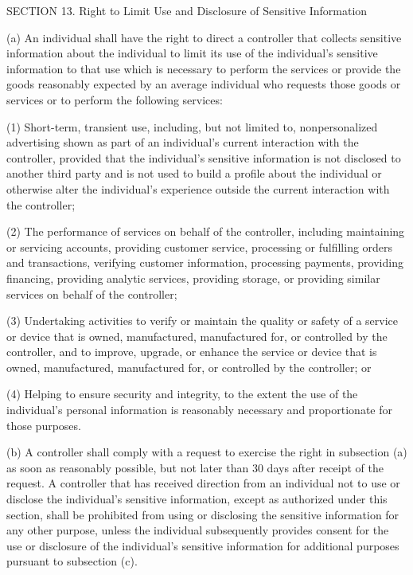 SECTION 13. Right to Limit Use and Disclosure of Sensitive Information

(a) An individual shall have the right to direct a controller that collects sensitive information about the individual to limit its use of the individual’s sensitive information to that use which is necessary to perform the services or provide the goods reasonably expected by an average individual who requests those goods or services or to perform the following services:

(1) Short-term, transient use, including, but not limited to, nonpersonalized advertising shown as part of an individual’s current interaction with the controller, provided that the individual’s sensitive information is not disclosed to another third party and is not used to build a profile about the individual or otherwise alter the individual’s experience outside the current interaction with the controller;

(2) The performance of services on behalf of the controller, including maintaining or servicing accounts, providing customer service, processing or fulfilling orders and transactions, verifying customer information, processing payments, providing financing, providing analytic services, providing storage, or providing similar services on behalf of the controller;

(3) Undertaking activities to verify or maintain the quality or safety of a service or device that is owned, manufactured, manufactured for, or controlled by the controller, and to improve, upgrade, or enhance the service or device that is owned, manufactured, manufactured for, or controlled by the controller; or

(4) Helping to ensure security and integrity, to the extent the use of the individual’s personal information is reasonably necessary and proportionate for those purposes.

(b) A controller shall comply with a request to exercise the right in subsection (a) as soon as reasonably possible, but not later than 30 days after receipt of the request. A controller that has received direction from an individual not to use or disclose the individual’s sensitive information, except as authorized under this section, shall be prohibited from using or disclosing the sensitive information for any other purpose, unless the individual subsequently provides consent for the use or disclosure of the individual’s sensitive information for additional purposes pursuant to subsection (c).


